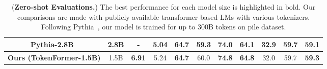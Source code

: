 \documentclass{article} %
\begin{document}
\begin{table}[t]
{\begin{tabular}{cccccccccc|c}
    Pythia-2.8B~\citep{biderman2023pythia}			& 2.8B	   & - &\textbf{5.04} & 64.7 & 59.3 & 74.0 & 64.1 &  \textbf{32.9} &  59.7 & 59.1\\
    \hline
    \textbf{Ours (TokenFormer-1.5B)}			& 1.5B	   & \textbf{6.91} & 5.24 & \textbf{64.7} & 60.0 & \textbf{74.8} & \textbf{64.8} &  32.0 & 59.7 & \textbf{59.3} \\
    \bottomrule
  \end{tabular}
  } 
  \vspace{-8pt}
    \caption{(\textbf{Zero-shot Evaluations.}) The best performance for each model size is highlighted in bold. Our comparisons are made with publicly available transformer-based LMs with various tokenizers. Following Pythia~\citep{biderman2023pythia}, our model is trained for up to 300B tokens on pile dataset. }
    \label{tab:llm_benchmark}
\end{table}
\begin{table}[t]
          \vspace{-2pt}
          \centering
        \caption{(\textbf{Image Classification.})  Comparison of standard vision transformer on ImageNet-1K. The training hyperparameters are completely consistent~(batch size, learning rate, etc.) with \citet{he2022masked}. $\dag$ denotes models where the parameter size has been matched to that of the standard ViT.}
        \label{tab:visual_benchmark}
        \vspace{-8pt}
\end{table}
\end{document}
